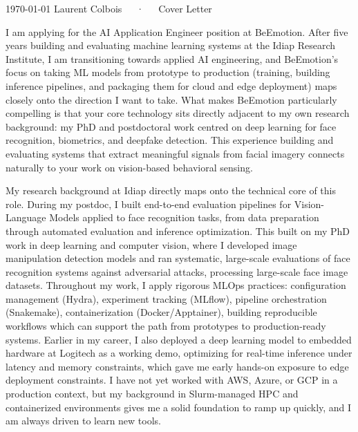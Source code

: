 \documentclass[11pt, a4paper]{awesome-cv}
\begin{document}
\makecvheader[R]

\makecvfooter
  {\today}
  {Laurent Colbois~~~·~~~Cover Letter}
  {}

\makelettertitle

\begin{cvletter}
I am applying for the AI Application Engineer position at BeEmotion. After five years building and evaluating machine learning systems at the Idiap Research Institute, I am transitioning towards applied AI engineering, and BeEmotion's focus on taking ML models from prototype to production (training, building inference pipelines, and packaging them for cloud and edge deployment) maps closely onto the direction I want to take. What makes BeEmotion particularly compelling is that your core technology sits directly adjacent to my own research background: my PhD and postdoctoral work centred on deep learning for face recognition, biometrics, and deepfake detection. This experience building and evaluating systems that extract meaningful signals from facial imagery  connects naturally to your work on vision-based behavioral sensing.


My research background at Idiap directly maps onto the technical core of this role. During my postdoc, I built end-to-end evaluation pipelines for Vision-Language Models applied to face recognition tasks, from data preparation through automated evaluation and inference optimization. This built on my PhD work in deep learning and computer vision, where I developed image manipulation detection models and ran systematic, large-scale evaluations of face recognition systems against adversarial attacks, processing large-scale face image datasets. Throughout my work, I apply rigorous MLOps practices: configuration management (Hydra), experiment tracking (MLflow), pipeline orchestration (Snakemake), containerization (Docker/Apptainer), building reproducible workflows which can support the path from prototypes to production-ready systems. Earlier in my career, I also deployed a deep learning model to embedded hardware at Logitech as a working demo, optimizing for real-time inference under latency and memory constraints, which gave me early hands-on exposure to edge deployment constraints. I have not yet worked with AWS, Azure, or GCP in a production context, but my background in Slurm-managed HPC and containerized environments gives me a solid foundation to ramp up quickly, and I am always driven to learn new tools.


\end{cvletter}
\end{document}
